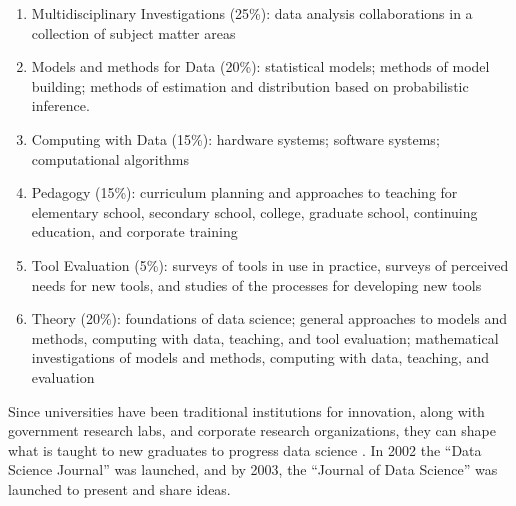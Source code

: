 \documentclass[010-intro.tex]{subfiles}
\begin{document}
    \begin{enumerate}
        \item Multidisciplinary Investigations (25\%):
            data analysis collaborations in a collection of subject matter areas
        \item Models and methods for Data (20\%):
            statistical models; methods of model building; methods of estimation and distribution based on probabilistic inference.
        \item Computing with Data (15\%):
            hardware systems; software systems; computational algorithms
        \item Pedagogy (15\%):
            curriculum planning and approaches to teaching for
            elementary school, secondary school, college, graduate school, continuing education, and corporate training
        \item Tool Evaluation (5\%):
            surveys of tools in use in practice, surveys of perceived needs for new tools, and studies of the processes for developing new tools
        \item Theory (20\%):
            foundations of data science;
            general approaches to models and methods, computing with data, teaching, and tool evaluation;
            mathematical investigations of models and methods, computing with data, teaching, and evaluation
    \end{enumerate}

    Since universities have been traditional institutions for innovation,
    along with government research labs,
    and corporate research organizations,
    they can shape what is taught to new graduates to progress data science
    \cite{clevelandDataScienceAction2001}.
    In 2002 the ``Data Science Journal'' was launched,
    and by 2003, the ``Journal of Data Science'' was launched
    to present and share ideas.
\end{document}
